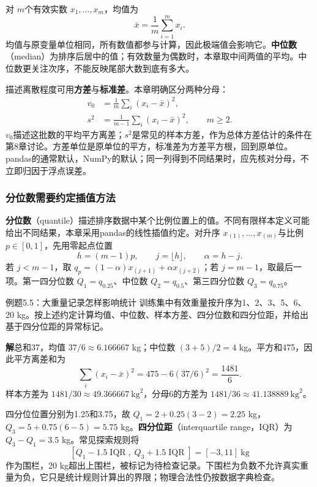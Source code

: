 \documentclass[UTF8,fontset=none,zihao=-4,a4paper]{ctexart}
\newcommand{\term}[1]{\textbf{#1}}
\newcommand{\sol}{\par\noindent\textbf{解}\quad}
\newcommand{\code}[1]{\texttt{\detokenize{#1}}}
\numberwithin{equation}{section}
\numberwithin{figure}{section}
\begin{document}
对 $m$个有效实数 $x_1,\ldots,x_m$，均值为
\[
 \bar x=\frac1m\sum_{i=1}^m x_i.
\]
均值与原变量单位相同，所有数值都参与计算，因此极端值会影响它。\term{中位数}（median）为排序后居中的值；有效数量为偶数时，本章取中间两值的平均。中位数更关注次序，不能反映尾部大数到底有多大。

描述离散程度可用\term{方差}与\term{标准差}。本章明确区分两种分母：
\begin{align*}
 v_0&=\frac1m\sum_i(x_i-\bar x)^2,\\
 s^2&=\frac1{m-1}\sum_i(x_i-\bar x)^2,\qquad m\ge2.
\end{align*}
$v_0$描述这批数的平均平方离差；$s^2$是常见的样本方差，作为总体方差估计的条件在第8章讨论。方差单位是原单位的平方，标准差为方差平方根，回到原单位。pandas的\code{std()}通常默认\code{ddof=1}，NumPy的\code{std()}默认\code{ddof=0}；同一列得到不同结果时，应先核对分母，不立即归因于浮点误差。

\subsubsection{分位数需要约定插值方法}
\term{分位数}（quantile）描述排序数据中某个比例位置上的值。不同有限样本定义可能给出不同结果，本章采用pandas的线性插值约定。对升序 $x_{(1)},\ldots,x_{(m)}$与比例 $p\in[0,1]$，先用零起点位置
\[
 h=(m-1)p,\qquad j=\lfloor h\rfloor,\qquad \alpha=h-j.
\]
若 $j<m-1$，取 $q_p=(1-\alpha)x_{(j+1)}+\alpha x_{(j+2)}$；若 $j=m-1$，取最后一项。第一四分位数 $Q_1=q_{0.25}$、中位数 $Q_2=q_{0.5}$、第三四分位数 $Q_3=q_{0.75}$。

\begin{infobox}{例题5.5：大重量记录怎样影响统计}
训练集中有效重量按升序为1、2、3、5、6、20 kg。按上述约定计算均值、中位数、样本方差、四分位数和四分位距，并给出基于四分位距的异常标记。
\end{infobox}
\sol 总和37，均值 $37/6\approx6.166667$ kg；中位数 $(3+5)/2=4$ kg。平方和475，因此平方离差和为
\[
 \sum_i(x_i-\bar x)^2=475-6(37/6)^2=\frac{1481}{6}.
\]
样本方差为 $1481/30\approx49.366667\ \mathrm{kg}^2$，分母6的方差为 $1481/36\approx41.138889\ \mathrm{kg}^2$。

四分位位置分别为1.25和3.75，故 $Q_1=2+0.25(3-2)=2.25$ kg，$Q_3=5+0.75(6-5)=5.75$ kg。\term{四分位距}（interquartile range，IQR）为 $Q_3-Q_1=3.5$ kg。常见探索规则将
\[
 [Q_1-1.5\operatorname{IQR},\;Q_3+1.5\operatorname{IQR}]=[-3,11]\ \mathrm{kg}
\]
作为围栏，20 kg超出上围栏，被标记为待检查记录。下围栏为负数不允许真实重量为负，它只是统计规则计算出的界限；物理合法性仍按数据字典检查。
\end{document}

